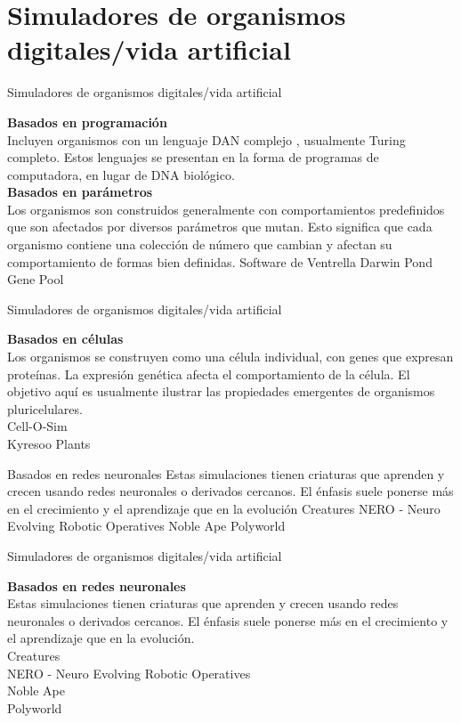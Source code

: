 \documentclass[11pt]{beamer}
\begin{document}
\section{Simuladores de organismos digitales/vida artificial}
	\begin{frame}{Simuladores de organismos digitales/vida artificial}
		\justify
		
		\textbf{Basados en programación}\\
Incluyen organismos con un lenguaje DAN complejo , usualmente Turing completo. Estos lenguajes se presentan en la forma de programas de computadora, en lugar de DNA biológico.\\
\textbf{Basados en parámetros}\\
Los organismos son construidos generalmente con comportamientos predefinidos que son afectados por diversos parámetros que mutan. Esto significa que cada organismo contiene una colección de número que cambian y afectan su comportamiento de formas bien definidas. Software de Ventrella Darwin Pond Gene Pool

	\end{frame}
	
	\begin{frame}{Simuladores de organismos digitales/vida artificial}
		\justify
		
		\textbf{Basados en células}\\
Los organismos se construyen como una célula individual, con genes que expresan proteínas. La expresión genética afecta el comportamiento de la célula. El objetivo aquí es usualmente ilustrar las propiedades emergentes de organismos pluricelulares.\\
Cell-O-Sim\\
Kyresoo Plants


Basados en redes neuronales
Estas simulaciones tienen criaturas que aprenden y crecen usando redes neuronales o derivados cercanos. El énfasis suele ponerse más en el crecimiento y el aprendizaje que en la evolución
Creatures
NERO - Neuro Evolving Robotic Operatives
Noble Ape
Polyworld

	\end{frame}
	\begin{frame}{Simuladores de organismos digitales/vida artificial}
		\justify
		
		\textbf{Basados en redes neuronales}\\
Estas simulaciones tienen criaturas que aprenden y crecen usando redes neuronales o derivados cercanos. El énfasis suele ponerse más en el crecimiento y el aprendizaje que en la evolución.\\
Creatures\\
NERO - Neuro Evolving Robotic Operatives\\
Noble Ape\\
Polyworld

	\end{frame}
	
\end{document}
